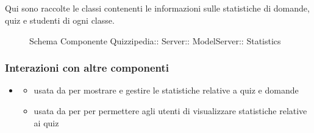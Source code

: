 \subsection{}
Qui sono raccolte le classi contenenti le informazioni sulle statistiche di domande, quiz e studenti di ogni classe.
\begin{figure}[H]
\centering
\noindent{}
\caption[Schema Componente Statistics]{Schema Componente Quizzipedia:: Server:: ModelServer:: Statistics}
\end{figure}
\subsubsection{Interazioni con altre componenti}
\begin{itemize}
\item {}
\begin{itemize}
\item usata da  per mostrare e gestire le statistiche relative a quiz e domande
\item usata da  per per permettere agli utenti di visualizzare statistiche relative ai quiz
\end{itemize}
\end{itemize}
